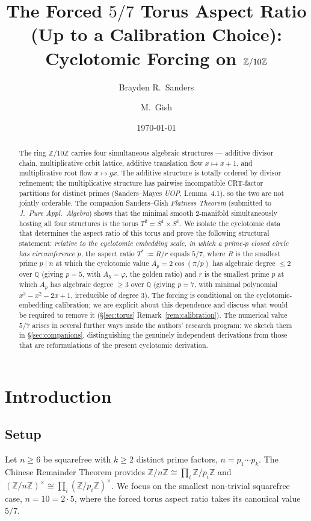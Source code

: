 \documentclass[11pt,reqno]{amsart}
\title[The forced $5/7$ torus (up to a calibration choice)]{The Forced $5/7$ Torus Aspect Ratio (Up to a Calibration Choice):\\
Cyclotomic Forcing on $\Z/10\Z$}
\author{Brayden R.\ Sanders}
\author{M.\ Gish}
\date{\today}
\theoremstyle{plain}
\theoremstyle{definition}
\newcommand{\Z}{\mathbb{Z}}
\newcommand{\Q}{\mathbb{Q}}
\newcommand{\Zn}{\Z/n\Z}
\newcommand{\Zns}{(\Z/n\Z)^{\times}}
\newcommand{\Zts}{\Z/10\Z}
\begin{document}
\begin{abstract}
The ring $\Zts$ carries four simultaneous algebraic structures --- additive divisor chain, multiplicative orbit lattice, additive translation flow $x \mapsto x+1$, and multiplicative root flow $x \mapsto gx$. The additive structure is totally ordered by divisor refinement; the multiplicative structure has pairwise incompatible CRT-factor partitions for distinct primes (Sanders--Mayes \emph{UOP}, Lemma~4.1), so the two are not jointly orderable. The companion Sanders--Gish \emph{Flatness Theorem} (submitted to \emph{J.\ Pure Appl.\ Algebra}) shows that the minimal smooth $2$-manifold simultaneously hosting all four structures is the torus $T^2 = S^1 \times S^1$. We isolate the cyclotomic data that determines the aspect ratio of this torus and prove the following structural statement: \emph{relative to the cyclotomic embedding scale, in which a prime-$p$ closed circle has circumference $p$,} the aspect ratio $T^{*} := R/r$ equals $5/7$, where $R$ is the smallest prime $p \mid n$ at which the cyclotomic value $A_p = 2 \cos(\pi/p)$ has algebraic degree $\le 2$ over $\Q$ (giving $p = 5$, with $A_5 = \varphi$, the golden ratio) and $r$ is the smallest prime $p$ at which $A_p$ has algebraic degree $\ge 3$ over $\Q$ (giving $p = 7$, with minimal polynomial $x^{3} - x^{2} - 2x + 1$, irreducible of degree $3$). The forcing is conditional on the cyclotomic-embedding calibration; we are explicit about this dependence and discuss what would be required to remove it (\S\ref{sec:torus} Remark~\ref{rem:calibration}). The numerical value $5/7$ arises in several further ways inside the authors' research program; we sketch them in \S\ref{sec:companions}, distinguishing the genuinely independent derivations from those that are reformulations of the present cyclotomic derivation.
\end{abstract}

\maketitle

\section{Introduction}

\subsection{Setup}

Let $n \geq 6$ be squarefree with $k \geq 2$ distinct prime factors, $n = p_1 \cdots p_k$. The Chinese Remainder Theorem provides $\Zn \cong \prod_i \Z/p_i\Z$ and $\Zns \cong \prod_i (\Z/p_i\Z)^{\times}$. We focus on the smallest non-trivial squarefree case, $n = 10 = 2 \cdot 5$, where the forced torus aspect ratio takes its canonical value $5/7$.
\end{document}
